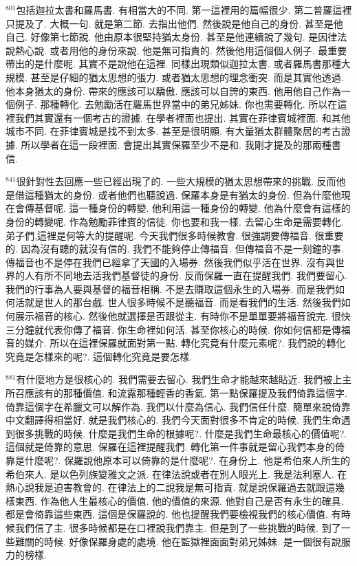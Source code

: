 \documentclass{book}
\begin{document}
$^{801}$包括迦拉太書和羅馬書.
有相當大的不同.
第一這裡用的篇幅很少.
第二普羅這裡只提及了.
大概一句.
就是第二節.
去指出他們.
然後說是他自己的身份.
甚至是他自己.
好像第七節說.
他由原本很堅持猶太身份.
甚至是他連續說了幾句.
是因律法說熱心說.
或者用他的身份來說.
他是無可指責的.
然後他用這個個人例子.
最重要帶出的是什麼呢.
其實不是說他在這裡.
同樣出現類似迦拉太書.
或者羅馬書那種大規模.
甚至是仔細的猶太思想的張力.
或者猶太思想的理念衝突.
而是其實他透過.
他本身猶太的身份.
帶來的應該可以驕傲.
應該可以自誇的東西.
他用他自己作為一個例子.
那種轉化.
去勉勵活在羅馬世界當中的弟兄姊妹.
你也需要轉化.
所以在這裡我們其實還有一個考古的證據.
在學者裡面也提出.
其實在菲律賓城裡面.
和其他城市不同.
在菲律賓城是找不到太多.
甚至是很明顯.
有大量猶太群體聚居的考古證據.
所以學者在這一段裡面.
會提出其實保羅至少不是和.
我剛才提及的那兩種書信.

$^{841}$很針對性去回應一些已經出現了的.
一些大規模的猶太思想帶來的挑戰.
反而他是借這種猶太的身份.
或者他們也聽說過.
保羅本身是有猶太的身份.
但為什麼他現在會傳基督呢.
這一種身份的轉變.
他利用這一種身份的轉變.
他為什麼會有這樣的身份的轉變呢.
作為勉勵菲律賓的信徒.
你也要和我一樣.
去留心生命是需要轉化.
弟子們,這裡是何等大的提醒呢.
今天我們很多時候教會.
很強調要傳福音.
很重要的.
因為沒有聽的就沒有信的.
我們不能夠停止傳福音.
但傳福音不是一刻鐘的事.
傳福音也不是停在我們已經拿了天國的入場券.
然後我們似乎活在世界.
沒有與世界的人有所不同地去活我們基督徒的身份.
反而保羅一直在提醒我們.
我們要留心.
我們的行事為人要與基督的福音相稱.
不是去賺取這個永生的入場券.
而是我們如何活就是世人的那台戲.
世人很多時候不是聽福音.
而是看我們的生活.
然後我們如何展示福音的核心.
然後他就選擇是否跟從主.
有時你不是單單要將福音說完.
很快三分鐘就代表你傳了福音.
你生命裡如何活.
甚至你核心的時候.
你如何信都是傳福音的媒介.
所以在這裡保羅就面對第一點.
轉化究竟有什麼元素呢?.
我們說的轉化究竟是怎樣來的呢?.
這個轉化究竟是要怎樣.

$^{881}$有什麼地方是很核心的.
我們需要去留心.
我們生命才能越來越貼近.
我們被上主所召應該有的那種價值.
和流露那種輕香的香氣.
第一點保羅提及我們倚靠這個字.
倚靠這個字在希臘文可以解作為.
我們以什麼為信心.
我們信任什麼.
簡單來說倚靠中文翻譯得相當好.
就是我們核心的.
我們今天面對很多不肯定的時候.
我們生命遇到很多挑戰的時候.
什麼是我們生命的根據呢?.
什麼是我們生命最核心的價值呢?.
這個就是倚靠的意思.
保羅在這裡提醒我們.
轉化第一件事就是留心我們本身的倚靠是什麼呢?.
保羅說他原本可以倚靠的是什麼呢?.
在身份上.
他是希伯來人所生的希伯來人.
是以色列族變雅文之派.
在律法說或者在別人眼光上.
我是法利塞人.
在熱心說我是迫害教會的.
在律法上的二說我是無可指責.
就是說保羅過去就跟這幾樣東西.
作為他人生最核心的價值.
他的價值的來源.
他對自己是否有永生的確具.
都是會倚靠這些東西.
這個是保羅說的.
他也提醒我們要檢視我們的核心價值.
有時候我們信了主.
很多時候都是在口裡說我們靠主.
但是到了一些挑戰的時候.
到了一些難關的時候.
好像保羅身處的處境.
他在監獄裡面面對弟兄姊妹.
是一個很有說服力的榜樣.
\end{document}
